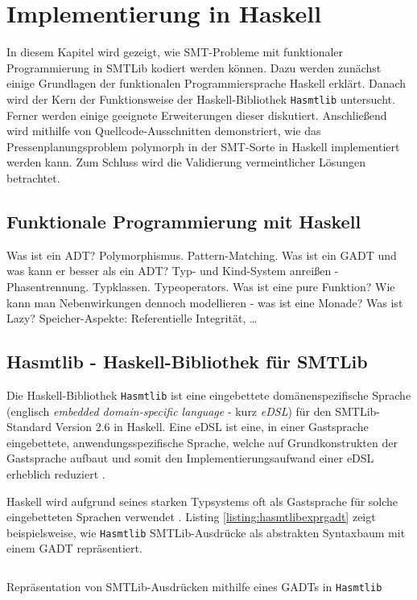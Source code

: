 \chapter{Implementierung in Haskell}
\label{chapter:implementierung}
In diesem Kapitel wird gezeigt, wie SMT-Probleme mit funktionaler Programmierung in SMTLib kodiert werden können.
Dazu werden zunächst einige Grundlagen der funktionalen Programmiersprache Haskell erklärt.
Danach wird der Kern der Funktionsweise der Haskell-Bibliothek \texttt{Hasmtlib} \cite{hasmtlib} untersucht.
Ferner werden einige geeignete Erweiterungen dieser diskutiert.
Anschließend wird mithilfe von Quellcode-Ausschnitten demonstriert, wie das Pressenplanungsproblem polymorph in der SMT-Sorte in Haskell implementiert werden kann.
Zum Schluss wird die Validierung vermeintlicher Lösungen betrachtet.

\section{Funktionale Programmierung mit Haskell}
\label{sec:haskell}
Was ist ein ADT?
Polymorphismus.
Pattern-Matching.
Was ist ein GADT und was kann er besser als ein ADT?
Typ- und Kind-System anreißen - Phasentrennung.
Typklassen.
Typeoperators.
Was ist eine pure Funktion?
Wie kann man Nebenwirkungen dennoch modellieren - was ist eine Monade?
Was ist Lazy?
Speicher-Aspekte: Referentielle Integrität, \ldots

\section{Hasmtlib - Haskell-Bibliothek für SMTLib}
Die Haskell-Bibliothek \texttt{Hasmtlib} \cite{hasmtlib} ist eine eingebettete domänenspezifische Sprache
(englisch \textit{embedded domain-specific language} - kurz \textit{eDSL}) für den SMTLib-Standard Version 2.6 \cite{smtlib} in Haskell.
Eine eDSL ist eine, in einer Gastsprache eingebettete, anwendungsspezifische Sprache, welche auf Grundkonstrukten der Gastsprache aufbaut und somit den
Implementierungsaufwand einer eDSL erheblich reduziert \cite{eDSL}.

Haskell wird aufgrund seines starken Typsystems oft als Gastsprache für solche eingebetteten Sprachen verwendet \cite{eDSL2}.
Listing \ref{listing:hasmtlibexprgadt} zeigt beispielsweise, wie \texttt{Hasmtlib} SMTLib-Ausdrücke als abstrakten Syntaxbaum mit einem GADT repräsentiert.

\begin{listing}[H]
    \inputminted[linenos=true]{haskell}{Code/Implementierung/Hasmtlib/ExprGADT.hs}
    \caption{Repräsentation von SMTLib-Ausdrücken mithilfe eines GADTs in \texttt{Hasmtlib} \cite{hasmtlibExpr}}
    \label{listing:hasmtlibexprgadt}
\end{listing}

